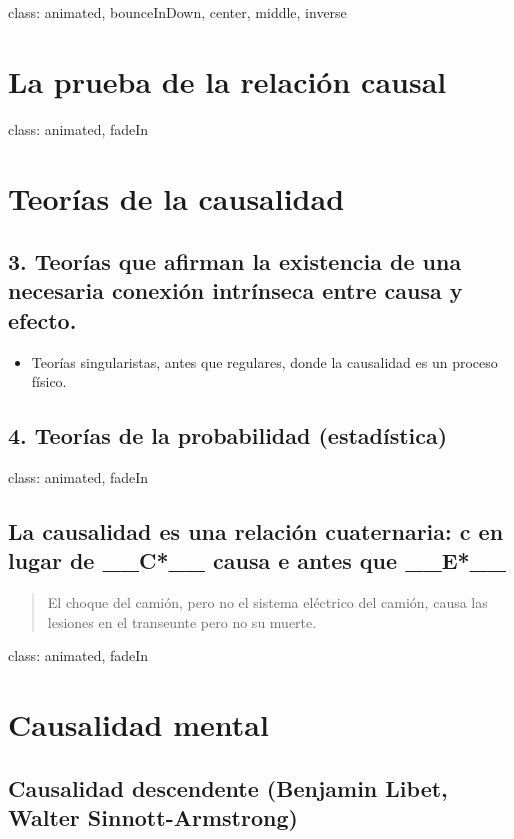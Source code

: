 \documentclass[
]{article}
\providecommand{\tightlist}{%
  \setlength{\itemsep}{0pt}\setlength{\parskip}{0pt}}
\begin{document}
class: animated, bounceInDown, center, middle, inverse

\section{La prueba de la relación causal}

class: animated, fadeIn

\section{Teorías de la causalidad}

\subsection{3. Teorías que afirman la existencia de una necesaria
conexión intrínseca entre causa y efecto.}

\begin{itemize}
\tightlist
\item
  Teorías singularistas, antes que regulares, donde la causalidad es un
  proceso físico.
\end{itemize}

\subsection{4. Teorías de la probabilidad (estadística)}

class: animated, fadeIn

\subsection{\texorpdfstring{La causalidad es una relación cuaternaria:
\textbf{c} en lugar de \_\_C*\_\_ causa \textbf{e} antes que
\_\_E*\_\_}{La causalidad es una relación cuaternaria: c en lugar de \_\_C*\_\_ causa e antes que \_\_E*\_\_}}

\begin{quote}
El choque del camión, pero no el sistema eléctrico del camión, causa las
lesiones en el transeunte pero no su muerte.
\end{quote}

class: animated, fadeIn

\section{Causalidad mental}

\subsection{Causalidad descendente (Benjamin Libet, Walter
Sinnott-Armstrong)}
\end{document}
